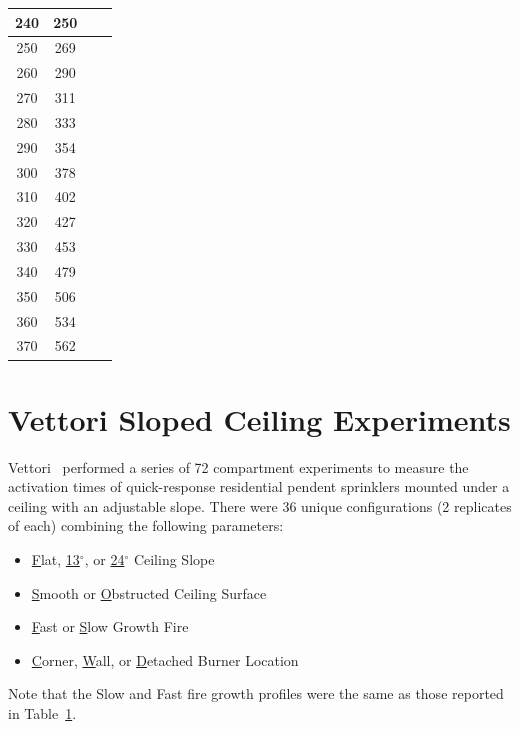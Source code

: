 \begin{table}[h!]
\begin{center}
\begin{tabular}{|c|c|c|c|}
240      &  250     &            &        \\ \hline
250      &  269     &            &        \\ \hline
260      &  290     &            &        \\ \hline
270      &  311     &            &        \\ \hline
280      &  333     &            &        \\ \hline
290      &  354     &            &        \\ \hline
300      &  378     &            &        \\ \hline
310      &  402     &            &        \\ \hline
320      &  427     &            &        \\ \hline
330      &  453     &            &        \\ \hline
340      &  479     &            &        \\ \hline
350      &  506     &            &        \\ \hline
360      &  534     &            &        \\ \hline
370      &  562     &            &        \\ \hline
\end{tabular}
\end{center}
\label{Vettori_Ramps}
\end{table}

\section{Vettori Sloped Ceiling Experiments}
\label{Vettori_Sloped_Ceiling_Description}

Vettori~\cite{Vettori:2} performed a series of 72 compartment experiments to measure the activation times of quick-response residential pendent sprinklers mounted under a ceiling with an adjustable slope. There were 36 unique configurations (2 replicates of each) combining the following parameters:
\begin{itemize}
\item \underline{F}lat, \underline{13}$^\circ$, or \underline{24}$^\circ$ Ceiling Slope
\item \underline{S}mooth or \underline{O}bstructed Ceiling Surface
\item \underline{F}ast or \underline{S}low Growth Fire
\item \underline{C}orner, \underline{W}all, or \underline{D}etached Burner Location
\end{itemize}
Note that the Slow and Fast fire growth profiles were the same as those reported in Table~\ref{Vettori_Ramps}.





